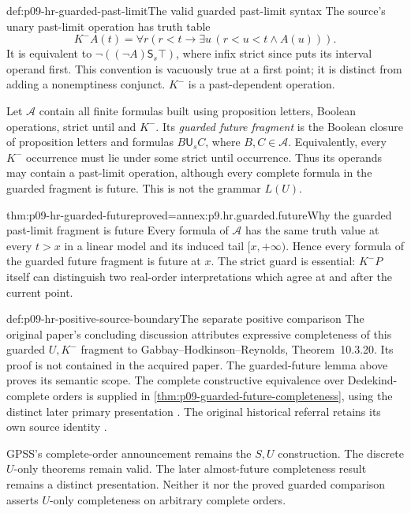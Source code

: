 \begin{hbdefinition}{def:p09-hr-guarded-past-limit}{The valid guarded past-limit syntax}
The source's unary past-limit operation has truth table
\[
 K^-A(t)=
          \forall r\left(r<t\longrightarrow
                     \exists u\,(r<u<t\land A(u))\right).
\]
It is equivalent to \(\neg((\neg A)\mathbin{\mathsf S_s}\top)\),
where infix strict since puts its interval operand first.
This convention is vacuously true at a first point; it
is distinct from adding a nonemptiness conjunct.
\(K^-\) is a past-dependent operation.

Let \(\mathcal A\) contain all finite formulas built
using proposition letters, Boolean operations, strict
until and \(K^-\). Its \emph{guarded future fragment}
is the Boolean closure of proposition letters and
formulas \(B\mathbin{\mathsf U_s}C\), where
\(B,C\in\mathcal A\). Equivalently, every \(K^-\)
occurrence must lie under some strict until occurrence.
Thus its operands may contain a past-limit operation,
although every complete formula in the guarded
fragment is future. This is not the grammar \(L(U)\).
\end{hbdefinition}

\begin{hblemma}{thm:p09-hr-guarded-future}{proved=annex:p9.hr.guarded.future}{Why the guarded past-limit fragment is future}
Every formula of \(\mathcal A\) has the same truth
value at every \(t>x\) in a linear model and its
induced tail \([x,+\infty)\). Hence every formula
of the guarded future fragment is future at \(x\).
The strict guard is essential: \(K^-P\) itself
can distinguish two real-order interpretations
which agree at and after the current point.
\end{hblemma}

\begin{proofboundary}{def:p09-hr-positive-source-boundary}{The separate positive comparison}
The original paper's concluding discussion attributes
expressive completeness of this guarded \(U,K^-\)
fragment to Gabbay--Hodkinson--Reynolds, Theorem~10.3.20.
Its proof is not contained in the acquired paper.
The guarded-future lemma above proves its semantic scope.
The complete constructive equivalence over Dedekind-complete
orders is supplied in \cref{thm:p09-guarded-future-completeness},
using the distinct later primary presentation
\cite{Rabinovich2014Kamp}.
The original historical referral retains its own source identity
\cite[sec.~5, item~3]{HirshfeldRabinovich2003Future}.

GPSS's complete-order announcement remains the
\(S,U\) construction. The discrete \(U\)-only
theorems remain valid. The later almost-future
completeness result remains a distinct presentation.
Neither it nor the proved guarded comparison asserts
\(U\)-only completeness on arbitrary complete orders.
\end{proofboundary}
